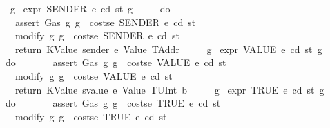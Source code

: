 \begin{isabellebody}
\ \ \ \ {\isacharbraceright}{\kern0pt}{\isacharparenright}{\kern0pt}\ g{\isachardoublequoteclose}\isanewline
{\isacharbar}{\kern0pt}\ {\isachardoublequoteopen}expr\ SENDER\ e\ cd\ st\ g\ {\isacharequal}{\kern0pt}\isanewline
\ \ \ \ {\isacharparenleft}{\kern0pt}do\ {\isacharbraceleft}{\kern0pt}\isanewline
\ \ \ \ \ \ assert\ Gas\ {\isacharparenleft}{\kern0pt}{\isasymlambda}g{\isachardot}{\kern0pt}\ g\ {\isachargreater}{\kern0pt}\ costs\isactrlsub e\ SENDER\ e\ cd\ st{\isacharparenright}{\kern0pt}{\isacharsemicolon}{\kern0pt}\isanewline
\ \ \ \ \ \ modify\ {\isacharparenleft}{\kern0pt}{\isasymlambda}g{\isachardot}{\kern0pt}\ g\ {\isacharminus}{\kern0pt}\ costs\isactrlsub e\ SENDER\ e\ cd\ st{\isacharparenright}{\kern0pt}{\isacharsemicolon}{\kern0pt}\isanewline
\ \ \ \ \ \ return\ {\isacharparenleft}{\kern0pt}KValue\ {\isacharparenleft}{\kern0pt}sender\ e{\isacharparenright}{\kern0pt}{\isacharcomma}{\kern0pt}\ Value\ TAddr{\isacharparenright}{\kern0pt}\isanewline
\ \ \ \ {\isacharbraceright}{\kern0pt}{\isacharparenright}{\kern0pt}\ g{\isachardoublequoteclose}\isanewline
{\isacharbar}{\kern0pt}\ {\isachardoublequoteopen}expr\ VALUE\ e\ cd\ st\ g\ {\isacharequal}{\kern0pt}\isanewline
\ \ \ \ {\isacharparenleft}{\kern0pt}do\ {\isacharbraceleft}{\kern0pt}\isanewline
\ \ \ \ \ \ assert\ Gas\ {\isacharparenleft}{\kern0pt}{\isasymlambda}g{\isachardot}{\kern0pt}\ g\ {\isachargreater}{\kern0pt}\ costs\isactrlsub e\ VALUE\ e\ cd\ st{\isacharparenright}{\kern0pt}{\isacharsemicolon}{\kern0pt}\isanewline
\ \ \ \ \ \ modify\ {\isacharparenleft}{\kern0pt}{\isasymlambda}g{\isachardot}{\kern0pt}\ g\ {\isacharminus}{\kern0pt}\ costs\isactrlsub e\ VALUE\ e\ cd\ st{\isacharparenright}{\kern0pt}{\isacharsemicolon}{\kern0pt}\isanewline
\ \ \ \ \ \ return\ {\isacharparenleft}{\kern0pt}KValue\ {\isacharparenleft}{\kern0pt}svalue\ e{\isacharparenright}{\kern0pt}{\isacharcomma}{\kern0pt}\ Value\ {\isacharparenleft}{\kern0pt}TUInt\ b{}{}{}{\isacharparenright}{\kern0pt}{\isacharparenright}{\kern0pt}\isanewline
\ \ \ \ {\isacharbraceright}{\kern0pt}{\isacharparenright}{\kern0pt}\ g{\isachardoublequoteclose}\isanewline
{\isacharbar}{\kern0pt}\ {\isachardoublequoteopen}expr\ TRUE\ e\ cd\ st\ g\ {\isacharequal}{\kern0pt}\isanewline
\ \ \ \ {\isacharparenleft}{\kern0pt}do\ {\isacharbraceleft}{\kern0pt}\isanewline
\ \ \ \ \ \ assert\ Gas\ {\isacharparenleft}{\kern0pt}{\isasymlambda}g{\isachardot}{\kern0pt}\ g\ {\isachargreater}{\kern0pt}\ costs\isactrlsub e\ TRUE\ e\ cd\ st{\isacharparenright}{\kern0pt}{\isacharsemicolon}{\kern0pt}\isanewline
\ \ \ \ \ \ modify\ {\isacharparenleft}{\kern0pt}{\isasymlambda}g{\isachardot}{\kern0pt}\ g\ {\isacharminus}{\kern0pt}\ costs\isactrlsub e\ TRUE\ e\ cd\ st{\isacharparenright}{\kern0pt}{\isacharsemicolon}{\kern0pt}\isanewline

\end{isabellebody}
